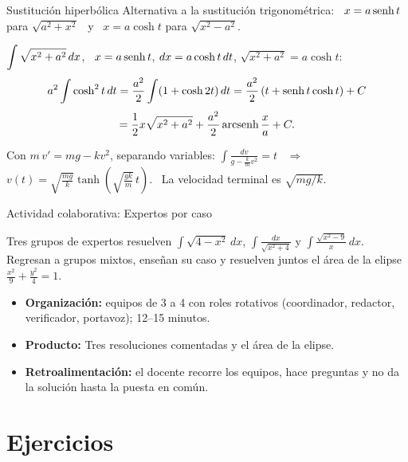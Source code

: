 \documentclass[10pt,aspectratio=169]{beamer}
\begin{document}
\begin{frame}{Sustitución hiperbólica}
  Alternativa a la sustitución trigonométrica: \ $x=a\operatorname{senh} t$ para $\sqrt{a^2+x^2}$ \ y \ $x=a\cosh t$ para $\sqrt{x^2-a^2}$.
  \begin{ejemplo}[9]
    $\displaystyle\int\sqrt{x^2+a^2}\,dx$, \ $x=a\operatorname{senh} t$, $dx=a\cosh t\,dt$, $\sqrt{x^2+a^2}=a\cosh t$:
    \[ a^2\int\cosh^2t\,dt=\frac{a^2}2\int(1+\cosh2t)\,dt=\frac{a^2}2\left(t+\operatorname{senh} t\cosh t\right)+C \]
    \[ =\frac12x\sqrt{x^2+a^2}+\frac{a^2}2\operatorname{arcsenh}\frac xa+C. \]
  \end{ejemplo}
  \begin{ejemplo}
    Con $m\,v'=mg-kv^2$, separando variables: $\displaystyle\int\frac{dv}{g-\frac km v^2}=t$ \ $\Rightarrow$ \
    $v(t)=\sqrt{\tfrac{mg}{k}}\tanh\!\left(\sqrt{\tfrac{gk}{m}}\,t\right)$. \ La velocidad terminal es $\sqrt{mg/k}$.
  \end{ejemplo}
\end{frame}

\begin{frame}{Actividad colaborativa: Expertos por caso}
  \small
  \begin{activa}
    Tres grupos de expertos resuelven $\int\sqrt{4-x^2}\,dx$, $\int\frac{dx}{\sqrt{x^2+4}}$ y $\int\frac{\sqrt{x^2-9}}{x}\,dx$. Regresan a grupos mixtos, enseñan su caso y resuelven juntos el área de la elipse $\frac{x^2}{9}+\frac{y^2}{4}=1$.
  \end{activa}
  \begin{itemize}
    \item \textbf{Organización:} equipos de 3 a 4 con roles rotativos (coordinador, redactor, verificador, portavoz); 12--15 minutos.
    \item \textbf{Producto:} Tres resoluciones comentadas y el área de la elipse.
    \item \textbf{Retroalimentación:} el docente recorre los equipos, hace preguntas y no da la solución hasta la puesta en común.
  \end{itemize}
\end{frame}

\section{Ejercicios}
\end{document}
